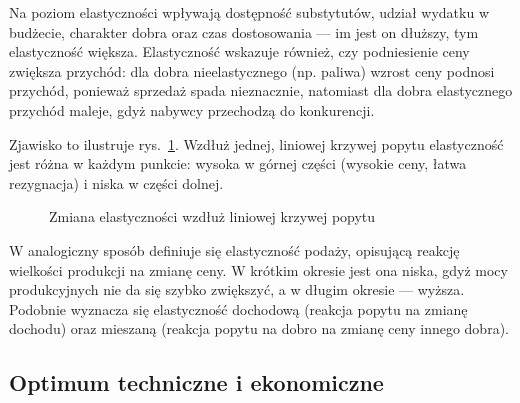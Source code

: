 Na poziom elastyczności wpływają dostępność substytutów, udział wydatku w budżecie, charakter dobra oraz czas dostosowania --- im jest on dłuższy, tym elastyczność większa. Elastyczność wskazuje również, czy podniesienie ceny zwiększa przychód: dla dobra nieelastycznego (np. paliwa) wzrost ceny podnosi przychód, ponieważ sprzedaż spada nieznacznie, natomiast dla dobra elastycznego przychód maleje, gdyż nabywcy przechodzą do konkurencji.

Zjawisko to ilustruje rys.~\ref{fig:elast}. Wzdłuż jednej, liniowej krzywej popytu elastyczność jest różna w każdym punkcie: wysoka w górnej części (wysokie ceny, łatwa rezygnacja) i niska w części dolnej.

\begin{figure}[h]
\centering
{}
\caption{Zmiana elastyczności wzdłuż liniowej krzywej popytu}
\label{fig:elast}
\zrodlo
\end{figure}

W analogiczny sposób definiuje się elastyczność podaży, opisującą reakcję wielkości produkcji na zmianę ceny. W krótkim okresie jest ona niska, gdyż mocy produkcyjnych nie da się szybko zwiększyć, a w długim okresie --- wyższa. Podobnie wyznacza się elastyczność dochodową (reakcja popytu na zmianę dochodu) oraz mieszaną (reakcja popytu na dobro na zmianę ceny innego dobra).

\subsection{Optimum techniczne i ekonomiczne}

